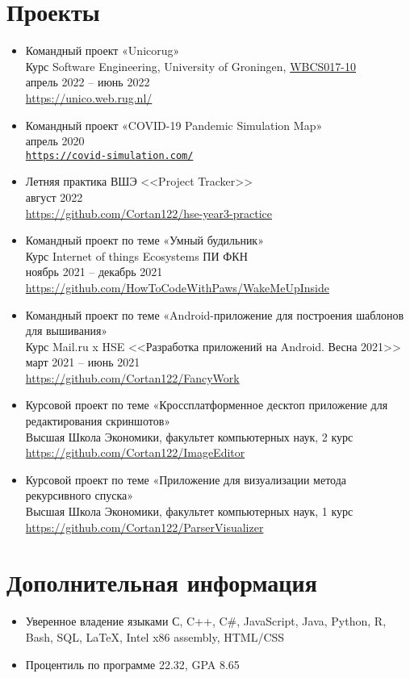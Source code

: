 \documentclass[12pt]{article}
\begin{document}
  \section{Проекты}
  \begin{itemize}
    \item Командный проект «Unicorug» \\
    Курс Software Engineering, University of Groningen,
    \href{https://www.rug.nl/ocasys/fwn/vak/show?code=WBCS017-10}{WBCS017-10} \\
    апрель 2022 -- июнь 2022 \\
    \url{https://unico.web.rug.nl/}

    \item Командный проект «COVID-19 Pandemic Simulation Map» \\
    апрель 2020 \\
    \href{http://covid-simulation.tk/}{\texttt{https://covid-simulation.com/}}

    \item Летняя практика ВШЭ <<Project Tracker>> \\
    август 2022 \\
    \url{https://github.com/Cortan122/hse-year3-practice}

    \item Командный проект по теме «Умный будильник» \\
    Курс Internet of things Ecosystems ПИ ФКН \\
    ноябрь 2021 -- декабрь 2021 \\
    \url{https://github.com/HowToCodeWithPaws/WakeMeUpInside}

    \item Командный проект по теме «Android-приложение для построения шаблонов для вышивания» \\
    Курс Mail.ru x HSE <<Разработка приложений на Android. Весна 2021>> \\
    март 2021 -- июнь 2021 \\
    \url{https://github.com/Cortan122/FancyWork}

    \item Курсовой проект по теме «Кроссплатформенное десктоп приложение для редактирования скриншотов» \\
    Высшая Школа Экономики, факультет компьютерных наук, 2 курс \\
    \url{https://github.com/Cortan122/ImageEditor}

    \item Курсовой проект по теме «Приложение для визуализации метода рекурсивного спуска» \\
    Высшая Школа Экономики, факультет компьютерных наук, 1 курс \\
    \url{https://github.com/Cortan122/ParserVisualizer}

  \end{itemize}

  \section{Дополнительная информация}
  \begin{itemize}
    \item Уверенное владение языками С, C++, C\#, JavaScript, Java, Python, R, Bash, SQL, \LaTeX, Intel x86 assembly, HTML/CSS
    \item Процентиль по программе 22.32, GPA 8.65
  \end{itemize}
\end{document}
